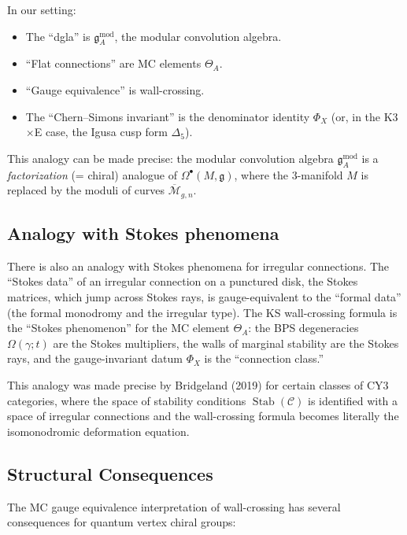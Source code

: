 \documentclass[11pt]{article}
\theoremstyle{definition}
\theoremstyle{remark}
\newcommand{\frakg}{\mathfrak{g}}
\newcommand{\cC}{\mathcal{C}}
\newcommand{\cM}{\mathcal{M}}
\DeclareMathOperator{\Stab}{Stab}
\begin{document}
In our setting:
\begin{itemize}
\item The ``dgla'' is $\frakg^{\mathrm{mod}}_A$, the modular convolution
 algebra.
\item ``Flat connections'' are MC elements $\Theta_A$.
\item ``Gauge equivalence'' is wall-crossing.
\item The ``Chern--Simons invariant'' is the denominator identity
 $\Phi_X$ (or, in the K3$\times$E case, the Igusa cusp form $\Delta_5$).
\end{itemize}

This analogy can be made precise: the modular convolution algebra
$\frakg^{\mathrm{mod}}_A$ is a \emph{factorization} (= chiral) analogue
of $\Omega^\bullet(M, \frakg)$, where the 3-manifold $M$ is replaced by
the moduli of curves $\overline{\cM}_{g,n}$.

\subsection{Analogy with Stokes phenomena}
\label{ssec:stokes}

There is also an analogy with Stokes phenomena for irregular connections.
The ``Stokes data'' of an irregular connection on a punctured disk,
the Stokes matrices, which jump across Stokes rays, is gauge-equivalent
to the ``formal data'' (the formal monodromy and the irregular type).
The KS wall-crossing formula is the ``Stokes phenomenon'' for the MC
element $\Theta_A$: the BPS degeneracies $\Omega(\gamma; t)$ are the
Stokes multipliers, the walls of marginal stability are the Stokes rays,
and the gauge-invariant datum $\Phi_X$ is the ``connection class.''

This analogy was made precise by Bridgeland (2019) for certain classes
of CY3 categories, where the space of stability conditions
$\Stab(\cC)$ is identified with a space of irregular connections and
the wall-crossing formula becomes literally the isomonodromic
deformation equation.

\subsection{Structural Consequences}
\label{ssec:implications}

The MC gauge equivalence interpretation of wall-crossing has several
consequences for quantum vertex chiral groups:
\end{document}
